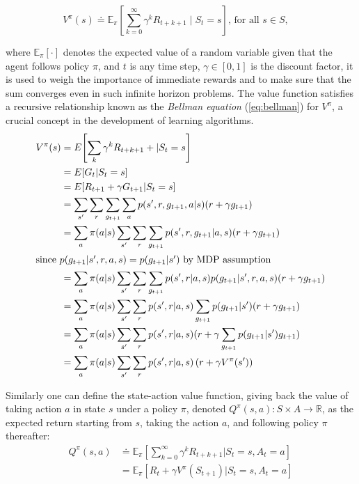 $$
V^{\pi}(s) \doteq 
\mathbb{E}_{\pi}\left[\sum_{k=0}^{\infty} \gamma^{k} R_{t+k+1} \mid S_{t}=s \right]
 \text {, for all } s \in S, \quad
$$

where \(\mathbb{E}_{\pi}[\cdot]\) denotes the expected value of a random variable given that the agent follows
policy \(\pi\), and \(t\) is any time step, $\gamma \in [0,1]$ is the discount factor, it is used 
to weigh the importance of immediate rewards and to make sure that the sum converges even in 
such infinite horizon problems.
The value function satisfies a recursive relationship known as the \emph{Bellman equation} (\ref{eq:bellman}) 
for \(V^{\pi}\), a crucial concept in the development of learning algorithms.
\begin{align}   
V^{\pi}(s)&=E{\left[\sum_{k} \gamma^k R_{t+k+1}+|S_t=s\right]} \nonumber \\
&=E{\left[G_t|S_t=s\right]} \nonumber \\
&=E{\left[R_{t+1}+\gamma G_{t+1}|S_t=s\right]} \nonumber \\
&= \sum_{s'}\sum_{r}\sum_{g_{t+1}}\sum_{a}p(s',r,g_{t+1}, a|s)(r+\gamma g_{t+1}) \nonumber \\
&= \sum_{a}\pi(a|s)\sum_{s'}\sum_{r}\sum_{g_{t+1}}p(s',r,g_{t+1} |a, s)(r+\gamma g_{t+1}) \nonumber \\
\intertext{since $p(g_{t+1}|s', r, a, s)=p(g_{t+1}|s')$ by MDP assumption}
&= \sum_{a}\pi(a|s)\sum_{s'}\sum_{r}\sum_{g_{t+1}}p(s',r|a, s)p(g_{t+1}|s', r, a, s)(r+\gamma g_{t+1}) \nonumber \\
&= \sum_{a}\pi(a|s)\sum_{s'}\sum_{r}p(s',r|a, s)\sum_{g_{t+1}}p(g_{t+1}|s')(r+\gamma g_{t+1}) \nonumber \\
&= \sum_{a}\pi(a|s)\sum_{s'}\sum_{r}p(s',r|a, s)(r+\gamma\sum_{g_{t+1}}p(g_{t+1}|s')g_{t+1}) \nonumber \\
&=\sum_{a}\pi(a|s)\sum_{s'}\sum_{r}p(s',r|a, s)\left(r+\gamma V^{\pi}(s')\right) \label{eq:bellman}
\end{align}

Similarly one can define the state-action value function, giving back the value of taking action \(a\) in 
state \(s\) under a policy \(\pi\), denoted
$Q^{\pi}(s, a): S \times A \rightarrow \mathbb{R}$, as the expected return starting from \(s\), taking the action \(a\), and
 following policy \(\pi\) thereafter:
\begin{align}
    Q^{\pi}(s, a) &\doteq \mathbb{E}_{\pi}\left[\sum_{k=0}^{\infty} \gamma^{k} R_{t+k+1} | S_{t}=s, A_{t}=a\right] \nonumber  \\
    &= \mathbb{E}_{\pi}\left[R_t + \gamma V^{\pi}(S_{t+1})| S_{t}=s, A_{t}=a\right] 
\end{align}


